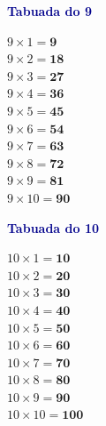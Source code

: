 \documentclass[12pt]{article}
\begin{document}
\begin{minipage}[t]{3.3cm}
\noindent\textcolor{darkblue}{\bfseries\small Tabuada do 9}\par\vspace{2pt}
{\footnotesize
$9\times1=\mathbf{9}$\\$9\times2=\mathbf{18}$\\$9\times3=\mathbf{27}$\\
$9\times4=\mathbf{36}$\\$9\times5=\mathbf{45}$\\$9\times6=\mathbf{54}$\\
$9\times7=\mathbf{63}$\\$9\times8=\mathbf{72}$\\$9\times9=\mathbf{81}$\\
$9\times10=\mathbf{90}$}
\end{minipage}\hfill
\begin{minipage}[t]{3.3cm}
\noindent\textcolor{darkblue}{\bfseries\small Tabuada do 10}\par\vspace{2pt}
{\footnotesize
$10\times1=\mathbf{10}$\\$10\times2=\mathbf{20}$\\$10\times3=\mathbf{30}$\\
$10\times4=\mathbf{40}$\\$10\times5=\mathbf{50}$\\$10\times6=\mathbf{60}$\\
$10\times7=\mathbf{70}$\\$10\times8=\mathbf{80}$\\$10\times9=\mathbf{90}$\\
$10\times10=\mathbf{100}$}
\end{minipage}

\vspace{8pt}
\end{document}
